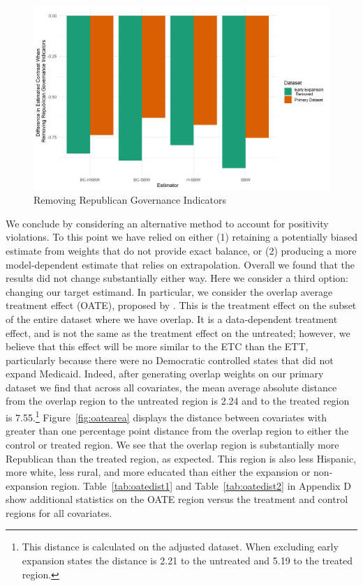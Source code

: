 \documentclass[aoas]{imsart}
\theoremstyle{plain}
\theoremstyle{remark}
\begin{document}
\begin{figure}
\begin{center}
    \caption{Removing Republican Governance Indicators}
    \label{fig:repub}
    \includegraphics[scale=0.6]{01_Plots/repub-diff-c1c2.png}
\end{center}
\end{figure}

We conclude by considering an alternative method to account for positivity violations. To this point we have relied on either (1) retaining a potentially biased estimate from weights that do not provide exact balance, or (2) producing a more model-dependent estimate that relies on extrapolation. Overall we found that the results did not change substantially either way. Here we consider a third option: changing our target estimand. In particular, we consider the overlap average treatment effect (OATE), proposed by \cite{li2018balancing}. This is the treatment effect on the subset of the entire dataset where we have overlap. It is a data-dependent treatment effect, and is not the same as the treatment effect on the untreated; however, we believe that this effect will be more similar to the ETC than the ETT, particularly because there were no Democratic controlled states that did not expand Medicaid. Indeed, after generating overlap weights on our primary dataset we find that across all covariates, the mean average absolute distance from the overlap region to the untreated region is 2.24 and to the treated region is 7.55.\footnote{This distance is calculated on the adjusted dataset. When excluding early expansion states the distance is 2.21 to the untreated and 5.19 to the treated region.} Figure~\ref{fig:oatearea} displays the distance between covariates with greater than one percentage point distance from the overlap region to either the control or treated region. We see that the overlap region is substantially more Republican than the treated region, as expected. This region is also less Hispanic, more white, less rural, and more educated than either the expansion or non-expansion region. Table~\ref{tab:oatedist1} and Table~\ref{tab:oatedist2} in Appendix D show additional statistics on the OATE region versus the treatment and control regions for all covariates.
\end{document}
